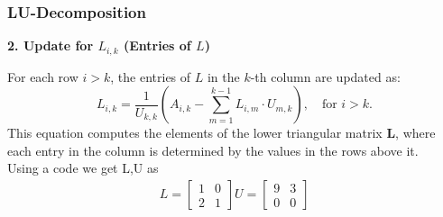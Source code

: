 \documentclass{beamer}
\theoremstyle{remark}
\numberwithin{equation}{section}
\begin{document}
\begin{frame}
\frametitle{LU-Decomposition}


\textbf{2. Update for $ L_{i,k} $ (Entries of $ L $)}

For each row $ i > k $, the entries of $ L $ in the $ k $-th column are updated as:
\[
L_{i,k} = \frac{1}{U_{k,k}} \left( A_{i,k} - \sum_{m=1}^{k-1} L_{i,m} \cdot U_{m,k} \right), \quad \text{for } i > k.
\]
This equation computes the elements of the lower triangular matrix $ \mathbf{L} $, where each entry in the column is determined by the values in the rows above it.\\
Using a code we get L,U as 
\begin{align}
    L=\begin{bmatrix} 1 & 0 \\ 2 & 1 \end{bmatrix}
    U=\begin{bmatrix} 9 & 3 \\ 0 & 0 \end{bmatrix}
\end{align}
\end{frame}
\end{document}
